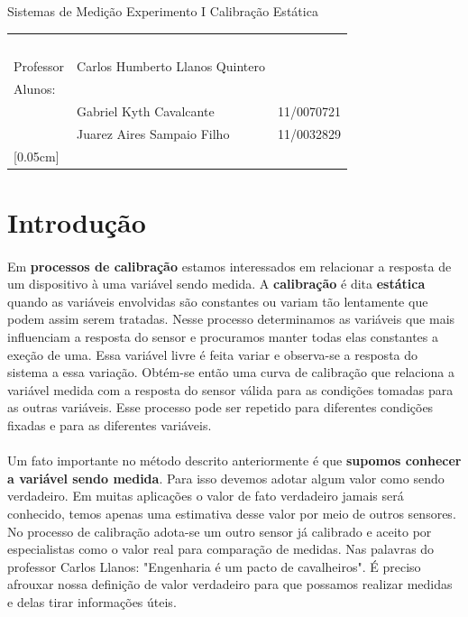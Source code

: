 \documentclass[a4paper,11pt]{article}
\begin{document}
\MakeMyTitlePage
{Sistemas de Medição}
{Experimento I}
{Calibração Estática}
{%
		\begin{tabular}{llr} \
		& & \\[0.05cm]		
		Professor & Carlos Humberto Llanos Quintero & \\
		
		Alunos:& & \\
		&Gabriel Kyth Cavalcante 			&	11/0070721\\
		&Juarez Aires Sampaio Filho 		&	11/0032829\\

	[0.05cm]	
		\end{tabular}
}
\section{Introdução}
\paragraph{}Em \textbf{processos de calibração} estamos interessados em relacionar a resposta
de um dispositivo à uma variável sendo medida. A \textbf{calibração} é dita \textbf{estática}
quando as variáveis envolvidas são constantes ou variam tão lentamente que podem
assim serem tratadas. Nesse processo determinamos as variáveis que 
mais influenciam a resposta do sensor e procuramos manter todas elas constantes
a exeção de uma. Essa variável livre é feita variar e observa-se a resposta 
do sistema a essa variação. Obtém-se então uma curva de calibração que relaciona
a variável medida com a resposta do sensor válida para as condições tomadas para
as outras variáveis. Esse processo pode ser repetido para diferentes condições
fixadas e para as diferentes variáveis.

\paragraph{}Um fato importante no método descrito anteriormente é que \textbf{supomos conhecer 
a variável sendo medida}. Para isso devemos adotar algum valor como sendo 
verdadeiro. Em muitas aplicações o valor de fato verdadeiro jamais será conhecido,
temos apenas uma estimativa desse valor por meio de outros sensores. 
No processo de calibração adota-se um outro sensor já calibrado e aceito
por especialistas como o valor real
para comparação de medidas. Nas palavras do professor Carlos Llanos: "Engenharia é
um pacto de cavalheiros". É preciso afrouxar nossa definição de valor verdadeiro para 
que possamos realizar medidas e delas tirar informações úteis.
\end{document}

